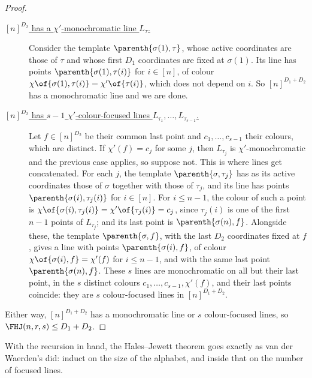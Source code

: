 \begin{proof}
\begin{description}
    \item[\underline{$[n]^{D_2}$ has a $\chi'$-monochromatic line $L_\tau$.}] Consider the template $\parenth{\sigma(1), \tau}$, whose active coordinates are those of $\tau$ and whose first $D_1$ coordinates are fixed at $\sigma(1)$. Its line has points $\parenth{\sigma(1), \tau(i)}$ for $i \in [n]$, of colour $\chi\of{\sigma(1), \tau(i)} = \chi'\of{\tau(i)}$, which does not depend on $i$. So $[n]^{D_1 + D_2}$ has a monochromatic line and we are done.
    \item[\underline{$[n]^{D_2}$ has $s - 1$ $\chi'$-colour-focused lines $L_{\tau_1}, \ldots, L_{\tau_{s - 1}}$.}] Let $f \in [n]^{D_2}$ be their common last point and $c_1, \ldots, c_{s - 1}$ their colours, which are distinct. If $\chi'(f) = c_j$ for some $j$, then $L_{\tau_j}$ is $\chi'$-monochromatic and the previous case applies, so suppose not. This is where lines get concatenated. For each $j$, the template $\parenth{\sigma, \tau_j}$ has as its active coordinates those of $\sigma$ together with those of $\tau_j$, and its line has points $\parenth{\sigma(i), \tau_j(i)}$ for $i \in [n]$. For $i \leq n - 1$, the colour of such a point is $\chi\of{\sigma(i), \tau_j(i)} = \chi'\of{\tau_j(i)} = c_j$, since $\tau_j(i)$ is one of the first $n - 1$ points of $L_{\tau_j}$; and its last point is $\parenth{\sigma(n), f}$. Alongside these, the template $\parenth{\sigma, f}$, with the last $D_2$ coordinates fixed at $f$, gives a line with points $\parenth{\sigma(i), f}$, of colour $\chi\of{\sigma(i), f} = \chi'(f)$ for $i \leq n - 1$, and with the same last point $\parenth{\sigma(n), f}$. These $s$ lines are monochromatic on all but their last point, in the $s$ distinct colours $c_1, \ldots, c_{s - 1}, \chi'(f)$, and their last points coincide: they are $s$ colour-focused lines in $[n]^{D_1 + D_2}$.
\end{description}
Either way, $[n]^{D_1 + D_2}$ has a monochromatic line or $s$ colour-focused lines, so $\FHJ(n, r, s) \leq D_1 + D_2$.
\end{proof}

With the recursion in hand, the Hales--Jewett theorem goes exactly as van der Waerden's did: induct on the size of the alphabet, and inside that on the number of focused lines.

